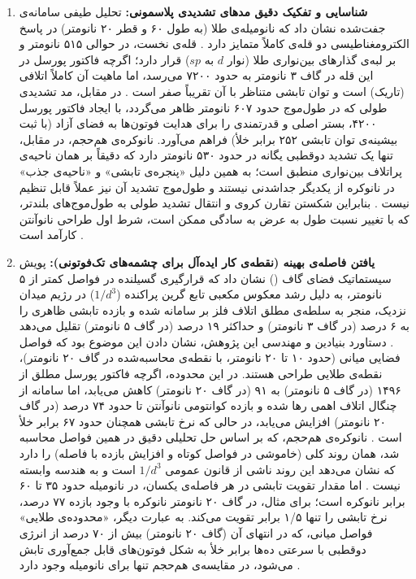 \documentclass[12pt,a4paper]{report}
\begin{document}
\begin{enumerate}
\item \textbf{شناسایی و تفکیک دقیق مدهای تشدیدی پلاسمونی:} تحلیل طیفی سامانه‌ی جفت‌شده نشان داد که نانومیله‌ی طلا (به طول ۶۰ و قطر ۲۰ نانومتر) در پاسخ الکترومغناطیسی دو قله‌ی کاملاً متمایز دارد \cite{maier}. قله‌ی نخست، در حوالی ۵۱۵ نانومتر و بر لبه‌ی گذارهای بین‌نواری طلا (نوار $d$ به $sp$) قرار دارد؛ اگرچه فاکتور پورسل در این قله در گاف ۳ نانومتر به حدود ۷۲۰۰ می‌رسد، اما ماهیت آن کاملاً اتلافی (تاریک) است و توان تابشی متناظر با آن تقریباً صفر است \cite{maier,novotny}. در مقابل، مد تشدیدی طولی که در طول‌موج حدود ۶۰۷ نانومتر ظاهر می‌گردد، با ایجاد فاکتور پورسل ۴۲۰۰، بستر اصلی و قدرتمندی را برای هدایت فوتون‌ها به فضای آزاد (با ثبت بیشینه‌ی توان تابشی ۲۵۲ برابر خلأ) فراهم می‌آورد. نانوکره‌ی هم‌حجم، در مقابل، تنها یک تشدید دوقطبی یگانه در حدود ۵۳۰ نانومتر دارد که دقیقاً بر همان ناحیه‌ی پراتلاف بین‌نواری منطبق است؛ به همین دلیل «پنجره‌ی تابشی» و «ناحیه‌ی جذب» در نانوکره از یکدیگر جداشدنی نیستند و طول‌موج تشدید آن نیز عملاً قابل تنظیم نیست \cite{kreibig,link,sonnichsen}. بنابراین شکستن تقارن کروی و انتقال تشدید طولی به طول‌موج‌های بلندتر، که با تغییر نسبت طول به عرض به سادگی ممکن است، شرط اول طراحی نانوآنتن کارآمد است \cite{novotny,maier}.

\item \textbf{یافتن فاصله‌ی بهینه (نقطه‌ی کار ایده‌آل برای چشمه‌های تک‌فوتونی):} پویش سیستماتیک فضای گاف () نشان داد که قرارگیری گسیلنده در فواصل کمتر از ۵ نانومتر، به دلیل رشد معکوس مکعبی تابع گرین پراکنده ($1/d^3$) در رژیم میدان نزدیک، منجر به سلطه‌ی مطلق اتلاف فلز بر سامانه شده و بازده تابشی ظاهری را به ۶ درصد (در گاف ۳ نانومتر) و حداکثر ۱۹ درصد (در گاف ۵ نانومتر) تقلیل می‌دهد \cite{novotny,anger}. دستاورد بنیادین و مهندسی این پژوهش، نشان دادن این موضوع بود که فواصل فضایی میانی (حدود ۱۰ تا ۲۰ نانومتر، با نقطه‌ی محاسبه‌شده در گاف ۲۰ نانومتر)، نقطه‌ی طلایی طراحی هستند. در این محدوده، اگرچه فاکتور پورسل مطلق از ۱۴۹۶ (در گاف ۵ نانومتر) به ۹۱ (در گاف ۲۰ نانومتر) کاهش می‌یابد، اما سامانه از چنگال اتلاف اهمی رها شده و بازده کوانتومی نانوآنتن تا حدود ۷۴ درصد (در گاف ۲۰ نانومتر) افزایش می‌یابد، در حالی که نرخ تابشی همچنان حدود ۶۷ برابر خلأ است \cite{novotny}. نانوکره‌ی هم‌حجم، که بر اساس حل تحلیلی دقیق در همین فواصل محاسبه شد، همان روند کلی (خاموشی در فواصل کوتاه و افزایش بازده با فاصله) را دارد که نشان می‌دهد این روند ناشی از قانون عمومی $1/d^3$ است و به هندسه وابسته نیست \cite{ruppin,anger}. اما مقدار تقویت تابشی در هر فاصله‌ی یکسان، در نانومیله حدود ۳۵ تا ۶۰ برابر نانوکره است؛ برای مثال، در گاف ۲۰ نانومتر نانوکره با وجود بازده ۷۷ درصد، نرخ تابشی را تنها ۱/۵ برابر تقویت می‌کند. به عبارت دیگر، «محدوده‌ی طلایی» فواصل میانی، که در انتهای آن (گاف ۲۰ نانومتر) بیش از ۷۰ درصد از انرژی دوقطبی با سرعتی ده‌ها برابر خلأ به شکل فوتون‌های قابل جمع‌آوری تابش می‌شود، در مقایسه‌ی هم‌حجم تنها برای نانومیله وجود دارد \cite{novotny,koenderink}.


\end{enumerate}
\end{document}
